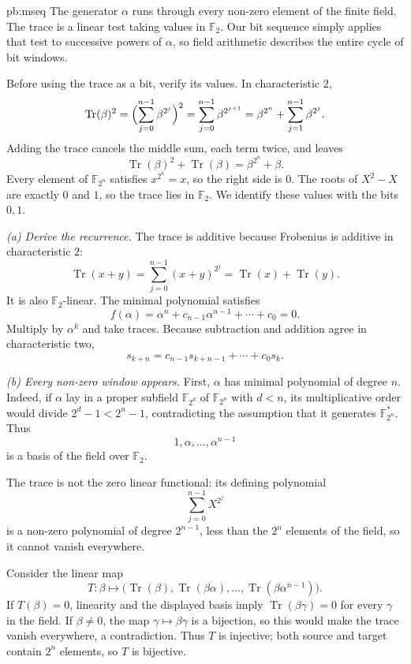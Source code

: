\begin{solution}{pb:mseq}
\idea The generator $\alpha$ runs through every non-zero element of the finite field. The trace is a linear test taking values in $\mathbb F_2$. Our bit sequence simply applies that test to successive powers of $\alpha$, so field arithmetic describes the entire cycle of bit windows.

\writeup Before using the trace as a bit, verify its values. In characteristic $2$,
\[
\operatorname{Tr}(\beta)^2
=\Bigl(\sum_{j=0}^{n-1}\beta^{2^j}\Bigr)^2
=\sum_{j=0}^{n-1}\beta^{2^{j+1}}
=\beta^{2^n}+\sum_{j=1}^{n-1}\beta^{2^j}.
\]
Adding the trace cancels the middle sum, each term twice, and leaves
\[
\operatorname{Tr}(\beta)^2+\operatorname{Tr}(\beta)
=\beta^{2^n}+\beta.
\]
Every element of $\mathbb F_{2^n}$ satisfies $x^{2^n}=x$, so the right side is $0$. The roots of $X^2-X$ are exactly $0$ and $1$, so the trace lies in
$\mathbb F_2$. We identify these values with the bits $0,1$.

\emph{(a) Derive the recurrence.}
The trace is additive because Frobenius is additive in characteristic $2$:
\[
\operatorname{Tr}(x+y)
=\sum_{j=0}^{n-1}(x+y)^{2^j}
=\operatorname{Tr}(x)+\operatorname{Tr}(y).
\]
It is also $\mathbb F_2$-linear. The minimal polynomial satisfies
\[
f(\alpha)=\alpha^n+c_{n-1}\alpha^{n-1}+\cdots+c_0=0.
\]
Multiply by $\alpha^k$ and take traces. Because subtraction and addition agree in characteristic two,
\[
\boxed{s_{k+n}=c_{n-1}s_{k+n-1}+\cdots+c_0s_k.}
\]

\emph{(b) Every non-zero window appears.}
First, $\alpha$ has minimal polynomial of degree $n$. Indeed, if $\alpha$ lay in a proper subfield $\mathbb F_{2^d}$ of $\mathbb F_{2^n}$ with $d<n$, its multiplicative order would divide $2^d-1<2^n-1$, contradicting the assumption that it generates $\mathbb F_{2^n}^*$. Thus
\[
1,\alpha,\ldots,\alpha^{n-1}
\]
is a basis of the field over $\mathbb F_2$.

The trace is not the zero linear functional: its defining polynomial
\[
\sum_{j=0}^{n-1}X^{2^j}
\]
is a non-zero polynomial of degree $2^{n-1}$, less than the $2^n$ elements of the field, so it cannot vanish everywhere.

Consider the linear map
\[
T:\beta\longmapsto
\bigl(\operatorname{Tr}(\beta),\operatorname{Tr}(\beta\alpha),
\ldots,\operatorname{Tr}(\beta\alpha^{n-1})\bigr).
\]
If $T(\beta)=0$, linearity and the displayed basis imply $\operatorname{Tr}(\beta\gamma)=0$ for every $\gamma$ in the field. If $\beta\ne0$, the map $\gamma\mapsto\beta\gamma$ is a bijection, so this would make the trace vanish everywhere, a contradiction. Thus $T$ is injective; both source and target contain $2^n$ elements, so $T$ is bijective.


\end{solution}
